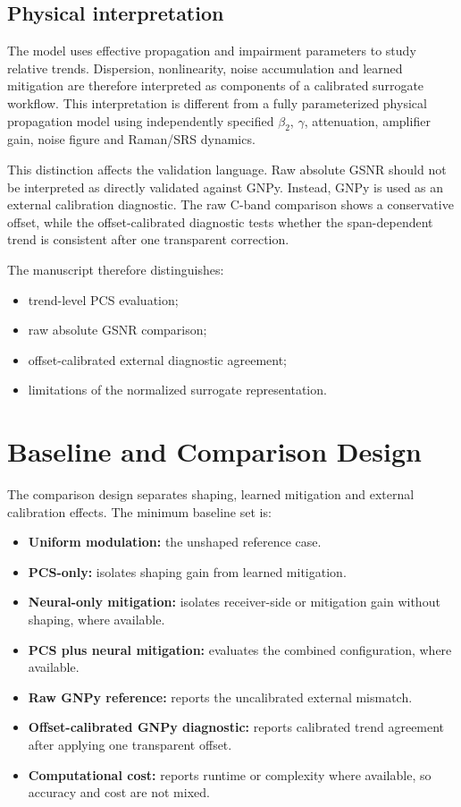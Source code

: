 ﻿\documentclass[pdflatex,sn-mathphys-num]{sn-jnl}
\begin{document}
\subsection{Physical interpretation}

The model uses effective propagation and impairment parameters to study relative trends. Dispersion, nonlinearity, noise accumulation and learned mitigation are therefore interpreted as components of a calibrated surrogate workflow. This interpretation is different from a fully parameterized physical propagation model using independently specified $\beta_2$, $\gamma$, attenuation, amplifier gain, noise figure and Raman/SRS dynamics.

This distinction affects the validation language. Raw absolute GSNR should not be interpreted as directly validated against GNPy. Instead, GNPy is used as an external calibration diagnostic. The raw C-band comparison shows a conservative offset, while the offset-calibrated diagnostic tests whether the span-dependent trend is consistent after one transparent correction.

The manuscript therefore distinguishes:
\begin{itemize}
    \item trend-level PCS evaluation;
    \item raw absolute GSNR comparison;
    \item offset-calibrated external diagnostic agreement;
    \item limitations of the normalized surrogate representation.
\end{itemize}

\section{Baseline and Comparison Design}

The comparison design separates shaping, learned mitigation and external calibration effects. The minimum baseline set is:
\begin{itemize}
    \item \textbf{Uniform modulation:} the unshaped reference case.
    \item \textbf{PCS-only:} isolates shaping gain from learned mitigation.
    \item \textbf{Neural-only mitigation:} isolates receiver-side or mitigation gain without shaping, where available.
    \item \textbf{PCS plus neural mitigation:} evaluates the combined configuration, where available.
    \item \textbf{Raw GNPy reference:} reports the uncalibrated external mismatch.
    \item \textbf{Offset-calibrated GNPy diagnostic:} reports calibrated trend agreement after applying one transparent offset.
    \item \textbf{Computational cost:} reports runtime or complexity where available, so accuracy and cost are not mixed.
\end{itemize}
\end{document}
